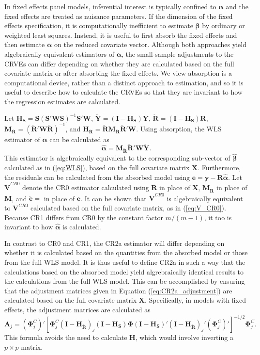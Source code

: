 \documentclass[12pt]{article}\usepackage[]{graphicx}\usepackage[]{color}
\newcommand{\bm}{\mathbf}
\newcommand{\bs}{\boldsymbol}
\begin{document}
In fixed effects panel models, inferential interest is typically confined to $\bs\alpha$ and the fixed effects are treated as nuisance parameters. 
If the dimension of the fixed effects specification, it is computationally inefficient to estimate $\bs\beta$ by ordinary or weighted least squares. 
Instead, it is useful to first absorb the fixed effects and then estimate $\bs\alpha$ on the reduced covariate vector.
Although both approaches yield algebraically equivalent estimators of $\bs\alpha$, the small-sample adjustments to the CRVEs can differ depending on whether they are calculated based on the full covariate matrix or after absorbing the fixed effects. 
We view absorption is a computational device, rather than a distinct approach to estimation, and so it is useful to describe how to calculate the CRVEs so that they are invariant to how the regression estimates are calculated.

Let $\bm{H_S} = \bm{S}\left(\bm{S}'\bm{W}\bm{S}\right)^{-1} \bm{S}'\bm{W}$, $\bm{\ddot{Y}} = \left(\bm{I} - \bm{H_S}\right)\bm{Y}$, $\bm{\ddot{R}} = \left(\bm{I} - \bm{H_S}\right)\bm{R}$, $\bm{M_{\ddot{R}}} = \left(\bm{\ddot{R}}' \bm{W} \bm{\ddot{R}}\right)^{-1}$, and $\bm{H_{\ddot{R}}} = \bm{\ddot{R}}\bm{M_{\ddot{R}}} \bm{\ddot{R}}' \bm{W}$. 
Using absorption, the WLS estimator of $\bs\alpha$ can be calculated as \[
\bs{\hat\alpha} = \bm{M_{\ddot{R}}} \bm{\ddot{R}}' \bm{W} \bm{\ddot{Y}}. \]
This estimator is algebraically equivalent to the corresponding sub-vector of $\bs{\hat\beta}$  calculated as in (\ref{eq:WLS}), based on the full covariate matrix $\bm{X}$. 
Furthermore, the residuals can be calculated from the absorbed model using $\bm{e} = \bm{\ddot{y}} - \bm{\ddot{R}} \bs{\hat\alpha}$.
Let $\bm{\ddot{V}}^{CR0}$ denote the CR0 estimator calculated using $\bm{\ddot{R}}$ in place of $\bm{X}$, $\bm{M_{\ddot{R}}}$ in place of $\bm{M}$, and $\bm{\ddot{e}} = $ in place of $\bm{e}$. It can be shown that $\bm{\ddot{V}}^{CR0}$ is algebraically equivalent to $\bm{V}^{CR0}$ calculated based on the full covariate matrix, as in (\ref{eq:V_CR0}). 
Because CR1 differs from CR0 by the constant factor $m / (m - 1)$, it too is invariant to how $\bs{\hat\alpha}$ is calculated. 

In contrast to CR0 and CR1, the CR2a estimator will differ depending on whether it is calculated based on the quantities from the absorbed model or those from the full WLS model. 
It is thus useful to define CR2a in such a way that the calculations based on the absorbed model yield algrebraically identical results to the calculations from the full WLS model. 
This can be accomplished by ensuring that the adjustment matrices given in Equation (\ref{eq:CR2a_adjustment}) are calculated based on the full covariate matrix $\bm{X}$. Specifically, in models with fixed effects, the adjustment matrices are calculated as \[
\bm{A}_j = \left(\bs\Phi_j^C\right)' \left[\bs\Phi_j^C\left(\bm{I} - \bm{H_{\ddot{R}}}\right)_j \left(\bm{I} - \bm{H_S}\right) \bs\Phi \left(\bm{I} - \bm{H_S}\right)' \left(\bm{I} - \bm{H_{\ddot{R}}}\right)_j' \left(\bs\Phi_j^C\right)' \right]^{-1/2}\bs\Phi_j^C.
\]
This formula avoids the need to calculate $\bm{H}$, which would involve inverting a $p \times p$ matrix.
\end{document}
